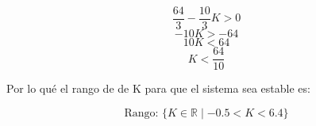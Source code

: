 \begin{equation*}
    \dfrac{64}{3} - \dfrac{10}{3} K > 0
\end{equation*}
\begin{equation*}
    - 10K > -64
\end{equation*}
\begin{equation*}
     10K < 64
\end{equation*}
\begin{equation*}
     K < \dfrac{64}{10}
\end{equation*}

Por lo qué el rango de de K para que el sistema sea estable es:

\begin{center}
        \colorbox{blue!35}{
            \parbox[c]{0.5\linewidth}{
                \begin{equation*}
                    \text{Rango: } 
                    \{K\in\mathbb{R} 
                    \mid-0{.}5 < K < 6{.}4 
                    \}
                \end{equation*}
            }
        }

\end{center}